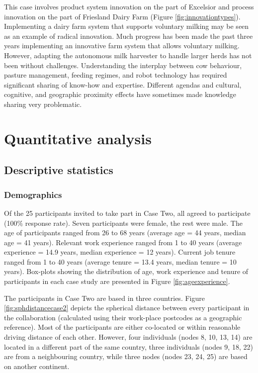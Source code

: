 This case involves product system innovation on the part of Excelsior and process innovation on the part of Friesland Dairy Farm (Figure \ref{fig:innovationtypes}). Implementing a dairy farm system that supports voluntary milking may be seen as an example of radical innovation. Much progress has been made the past three years implementing an innovative farm system that allows voluntary milking. However, adapting the autonomous milk harvester to handle larger herds has not been without challenges. Understanding the interplay between cow behaviour, pasture management, feeding regimes, and robot technology has required significant sharing of know-how and expertise. Different agendas and cultural, cognitive, and geographic proximity effects have sometimes made knowledge sharing very problematic.\medskip

\section{Quantitative analysis}

\subsection{Descriptive statistics}

\subsubsection{Demographics}

Of the 25 participants invited to take part in Case Two, all agreed to participate (100\% response rate). Seven participants were female, the rest were male. The age of participants ranged from 26 to 68 years (average age = 44 years, median age = 41 years). Relevant work experience ranged from 1 to 40 years (average experience = 14.9 years, median experience = 12 years). Current job tenure ranged from 1 to 40 years (average tenure = 13.4 years, median tenure = 10 years). Box-plots showing the distribution of age, work experience and tenure of participants in each case study are presented in Figure \ref{fig:ageexperience}.\medskip

The participants in Case Two are based in three countries. Figure \ref{fig:sphdistancecase2} depicts the spherical distance between every participant in the collaboration (calculated using their work-place postcodes as a geographic reference). Most of the participants are either co-located or within reasonable driving distance of each other. However, four individuals (nodes 8, 10, 13, 14) are located in a different part of the same country, three individuals (nodes 9, 18, 22) are from a neighbouring country, while three nodes (nodes 23, 24, 25) are based on another continent.\medskip

